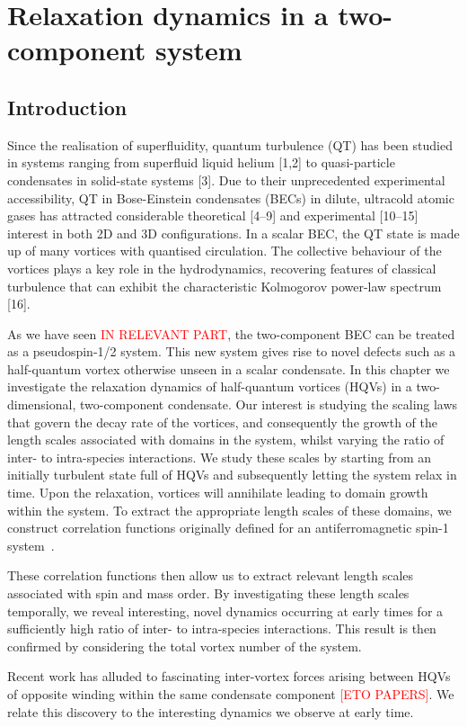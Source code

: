 \chapter{Relaxation dynamics in a two-component system}

\section{Introduction}
Since the realisation of superfluidity, quantum turbulence (QT) has been studied
 in systems ranging from superfluid liquid helium [1,2] to quasi-particle 
 condensates in solid-state systems [3]. 
Due to their unprecedented experimental accessibility, QT in Bose-Einstein 
condensates (BECs) in dilute, ultracold atomic gases has attracted considerable 
theoretical [4–9] and experimental [10–15] interest in both 2D and 3D 
configurations.
In a scalar BEC, the QT state is made up of many vortices with quantised 
circulation. 
The collective behaviour of the vortices plays a key role in the hydrodynamics, 
recovering features of classical turbulence that can exhibit the characteristic 
Kolmogorov power-law spectrum [16].

As we have seen \textcolor{red}{IN RELEVANT PART}, the two-component BEC can be 
treated as a pseudospin-1/2 system. 
This new system gives rise to novel defects such as a half-quantum vortex 
otherwise unseen in a scalar condensate. 
In this chapter we investigate the relaxation dynamics of half-quantum vortices 
(HQVs) in a two-dimensional, two-component condensate. 
Our interest is studying the scaling laws that govern the decay rate of the 
vortices, and consequently the growth of the length scales associated with 
domains in the system, whilst varying the ratio of inter- to intra-species 
interactions. 
We study these scales by starting from an initially turbulent state full of 
HQVs and subsequently letting the system relax in time. 
Upon the relaxation, vortices will annihilate leading to domain growth within 
the system.
To extract the appropriate length scales of these domains, we construct 
correlation functions originally defined for an antiferromagnetic spin-1 
system~\cite{Symes2017}.

These correlation functions then allow us to extract relevant length scales 
associated with spin and mass order. 
By investigating these length scales temporally, we reveal interesting, 
novel dynamics occurring at early times for a sufficiently high ratio of 
inter- to intra-species interactions. 
This result is then confirmed by considering the total vortex number of the 
system. 
\par
Recent work has alluded to fascinating inter-vortex forces arising between HQVs 
of opposite winding within the same condensate component 
\textcolor{red}{[ETO PAPERS]}. 
We relate this discovery to the interesting 
dynamics we observe at early time.

